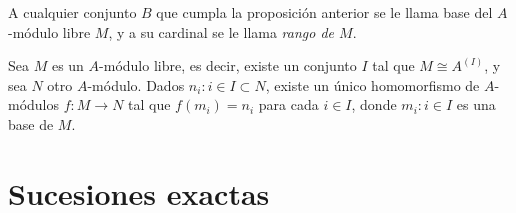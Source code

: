 \documentclass[../main.tex]{subfiles}
\begin{document}
\begin{definition}
  A cualquier conjunto $B$ que cumpla la proposición anterior se le llama base del $A$-módulo libre $M$, y a su cardinal se le llama \textit{rango de $M$}.
\end{definition}

\begin{corollary}
  Sea $M$ es un $A$-módulo libre, es decir, existe un conjunto $I$ tal que $M\cong A^{(I)}$, y sea $N$ otro $A$-módulo. Dados ${n_i:i\in I}\subset N$, existe un único homomorfismo de $A$-módulos $f:M\rightarrow N$ tal que $f(m_i)=n_i$ para cada $i\in I$, donde ${m_i: i\in I}$ es una base de $M$.
\end{corollary}

\section{Sucesiones exactas}
\end{document}
